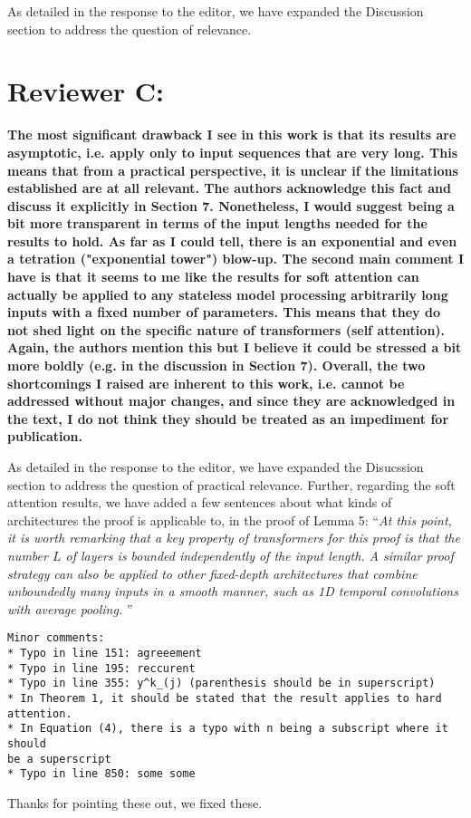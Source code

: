 \documentclass[11pt,a4paper]{article}
\newcommand\response[1]{{\color{blue}#1}}
\newcommand\newtext[1]{``\textit{#1}''}
\newcommand\original[1]{\textbf{#1}}
\begin{document}
\response{As detailed in the response to the editor, we have expanded the Discussion section to address the question of relevance.}


\section{Reviewer C:}

\original{The most significant drawback I see in this work is that its results are
asymptotic, i.e. apply only to input sequences that are very long.  This
means that from a practical perspective, it is unclear if the limitations
established are at all relevant.  The authors acknowledge this fact and
discuss it explicitly in Section 7.  Nonetheless, I would suggest being a
bit more transparent in terms of the input lengths needed for the results to
hold.  As far as I could tell, there is an exponential and even a tetration
("exponential tower") blow-up.  The second main comment I have is that it
seems to me like the results for soft attention can actually be applied to
any stateless model processing arbitrarily long inputs with a fixed number
of parameters.  This means that they do not shed light on the specific
nature of transformers (self attention).  Again, the authors mention this
but I believe it could be stressed a bit more boldly (e.g. in the discussion
in Section 7).  Overall, the two shortcomings I raised are inherent to this
work, i.e. cannot be addressed without major changes, and since they are
acknowledged in the text, I do not think they should be treated as an
impediment for publication.}

\response{As detailed in the response to the editor, we have expanded the Disucssion section to address the question of practical relevance. Further, regarding the soft attention results, we have added a few sentences about what kinds of architectures the proof is applicable to, in the proof of Lemma 5: \newtext{At this point, it is worth remarking that a key property of transformers for this proof is that the number $L$ of layers is bounded independently of the input length.
A similar proof strategy can also be applied to other fixed-depth architectures that combine unboundedly many inputs in a smooth manner, such as 1D temporal convolutions with average pooling.
}}

\begin{verbatim}
Minor comments:
* Typo in line 151: agreeement
* Typo in line 195: reccurent
* Typo in line 355: y^k_(j) (parenthesis should be in superscript)
* In Theorem 1, it should be stated that the result applies to hard
attention.
* In Equation (4), there is a typo with n being a subscript where it should
be a superscript
* Typo in line 850: some some
\end{verbatim}

\response{Thanks for pointing these out, we fixed these.}
\end{document}
